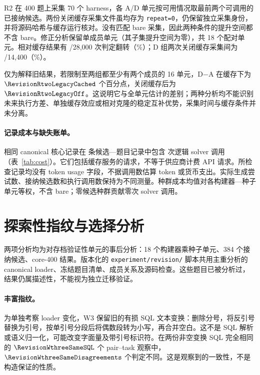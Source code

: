 R2 在 400 题上采集 70 个 harness，各 A/D 单元按可用情况取最前两个可调用的已接纳候选。两份关闭缓存采集文件虽均存为 \texttt{repeat=0}，仍保留独立采集身份，并将源码哈希与缓存运行核对。没有匹配 bare 采集，因此两种条件的提升空间都不含 bare。修正分析保留单成员单元（其子集提升空间为零），共 18 个配对单元。相对缓存结果有 \RevisionRtwoFlips/28,000 次判定翻转（\RevisionRtwoFlipPercent\%）；D 组两次关闭缓存采集间为 \RevisionRtwoRepeatFlips/14,400（\RevisionRtwoRepeatPercent\%）。

仅为解释旧结果，若限制至两组都至少有两个成员的 16 单元，D$-$A 在缓存下为 $\RevisionRtwoLegacyCached$ 个百分点，关闭缓存后为 $\RevisionRtwoLegacyOff$。这说明它与全单元估计的差别；两种分析均不能识别未来执行方差、单独缓存效应或相对克隆的稳定互补优势，采集时间与缓存条件并未分离。
\begin{table}[t]\centering\small

\caption{core-400、18 单元的修正敏感性结果，CI 未校正。K-matched 始终保留 bare；R2 排除 bare，并以已观察采集组为条件。}\label{tab:sensitivity}
\end{table}
\paragraph{记录成本与缺失账单。}相同 canonical 核心记录在 \RevisionCostRows{} 条候选—题目记录中包含 \RevisionLogicalCalls{} 次逻辑 solver 调用（表~\ref{tab:cost}）。它们包括缓存服务的请求，不等于供应商计费 API 请求。所检查记录均没有 token usage 字段，不据调用数估算 token 或货币支出。实际生成尝试数、接纳候选数和执行调用数保持为不同测量。种群成本均值对各构建器—种子单元等权，不含 bare；零候选种群贡献零次 solver 调用。
\begin{table}[t]\centering\small

\caption{core-400 canonical 描述性成本审核，每组 18 单元。逻辑调用不是计费请求或 token 数；末列为各单元候选种群每题调用数的均值。}\label{tab:cost}
\end{table}

\section{探索性指纹与选择分析}\label{app:rich}
两项分析均为对存档验证性单元的事后分析：18 个构建器乘种子单元、384 个接纳候选、core-400 结果。版本化的 \texttt{experiment/revision/} 脚本共用主重分析的 canonical loader、冻结题目清单、成员关系及源码检查。这些题目已被分析过，结果仍属描述性，不能视为独立迁移验证。
\paragraph{丰富指纹。}为单独考察 loader 变化，W3 保留旧的有损 SQL 文本变换：删除分号，将反引号替换为引号，按单引号分段后将偶数段转为小写，再合并空白。这不是 SQL 解析或语义归一化，可能改变字面量及带引号标识符。在两份非空变换 SQL 完全相同的 $\RevisionWthreeSameSQL$ 个 pair--task 观察中，$\RevisionWthreeSameDisagreements$ 个判定不同。这是观察到的一致性，不是构造保证的性质。

